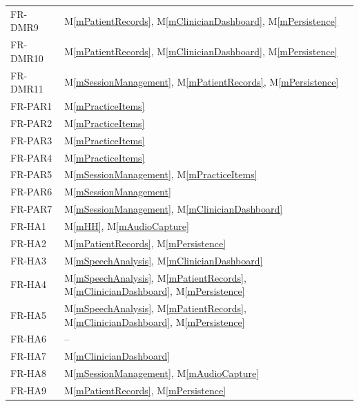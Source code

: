 \documentclass[12pt, titlepage]{article}
\newcommand{\mref}[1]{M\ref{#1}}
\begin{document}
\begin{longtable}{p{} p{}}
FR-DMR9  & \mref{mPatientRecords}, \mref{mClinicianDashboard}, \mref{mPersistence}\\
FR-DMR10 & \mref{mPatientRecords}, \mref{mClinicianDashboard}, \mref{mPersistence}\\
FR-DMR11 & \mref{mSessionManagement}, \mref{mPatientRecords}, \mref{mPersistence}\\
\midrule
FR-PAR1 & \mref{mPracticeItems}\\
FR-PAR2 & \mref{mPracticeItems}\\
FR-PAR3 & \mref{mPracticeItems}\\
FR-PAR4 & \mref{mPracticeItems}\\
FR-PAR5 & \mref{mSessionManagement}, \mref{mPracticeItems}\\
FR-PAR6 & \mref{mSessionManagement}\\
FR-PAR7 & \mref{mSessionManagement}, \mref{mClinicianDashboard}\\
\midrule
FR-HA1 & \mref{mHH}, \mref{mAudioCapture}\\
FR-HA2 & \mref{mPatientRecords}, \mref{mPersistence}\\
FR-HA3 & \mref{mSpeechAnalysis}, \mref{mClinicianDashboard}\\
FR-HA4 & \mref{mSpeechAnalysis}, \mref{mPatientRecords}, \mref{mClinicianDashboard}, \mref{mPersistence}\\
FR-HA5 & \mref{mSpeechAnalysis}, \mref{mPatientRecords}, \mref{mClinicianDashboard}, \mref{mPersistence}\\
FR-HA6 & --\\
FR-HA7 & \mref{mClinicianDashboard}\\
FR-HA8 & \mref{mSessionManagement}, \mref{mAudioCapture}\\
FR-HA9 & \mref{mPatientRecords}, \mref{mPersistence}\\
\end{longtable}
\end{document}
